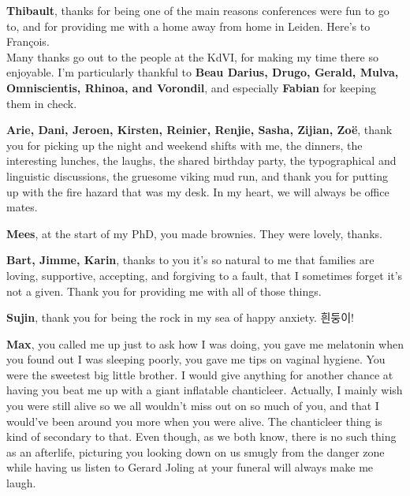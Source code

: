 {\bfseries Thibault}, thanks for being one of the main reasons conferences were fun to go to, and for providing me with a home away from home in Leiden. Here's to Fran\c{c}ois. \\

Many thanks go out to the people at the KdVI, for making my time there so enjoyable. I'm particularly thankful to {\bfseries Beau Darius, Drugo, Gerald, Mulva, Omniscientis, Rhinoa, and Vorondil}, and especially {\bfseries Fabian} for keeping them in check.

{\bfseries Arie, Dani, Jeroen, Kirsten, Reinier, Renjie, Sasha, Zijian, Zo\"e}, thank you for picking up the night and weekend shifts with me, the dinners, the interesting lunches, the laughs, the shared birthday party, the typographical and linguistic discussions, the gruesome viking mud run, and thank you for putting up with the fire hazard that was my desk. In my heart, we will always be office mates.

{{\bfseries Mees}, at the start of my PhD, you made brownies. They were lovely, thanks.} 

{\bfseries Bart, Jimme, Karin}, thanks to you it's so natural to me that families are loving, supportive, accepting, and forgiving to a fault, that I sometimes forget it's not a given. Thank you for providing me with all of those things.

{\bfseries Sujin}, thank you for being the rock in my sea of happy anxiety. 흰둥이!

{\bfseries Max}, you called me up just to ask how I was doing, you gave me melatonin when you found out I was sleeping poorly, you gave me tips on vaginal hygiene. You were the sweetest big little brother. I would give anything for another chance at having you beat me up with a giant inflatable chanticleer. Actually, I mainly wish you were still alive so we all wouldn't miss out on so much of you, and that I would've been around you more when you were alive. The chanticleer thing is kind of secondary to that. Even though, as we both know, there is no such thing as an afterlife, picturing you looking down on us smugly from the danger zone while having us listen to Gerard Joling at your funeral will always make me laugh.
